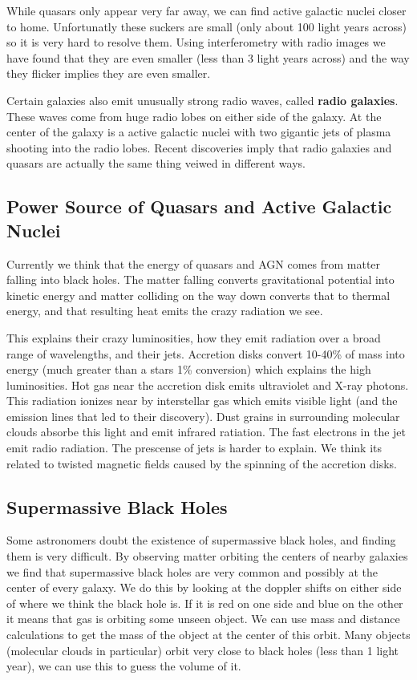 \documentclass[12pt]{article}
\begin{document}
While quasars only appear very far away, we can find active galactic nuclei closer to home. Unfortunatly these suckers are small (only about 100 light years across) so it is very hard to resolve them. Using interferometry with radio images we have found that they are even smaller (less than 3 light years across) and the way they flicker implies they are even smaller.

Certain galaxies also emit unusually strong radio waves, called \textbf{radio galaxies}. These waves come from huge radio lobes on either side of the galaxy. At the center of the galaxy is a active galactic nuclei with two gigantic jets of plasma shooting into the radio lobes. Recent discoveries imply that radio galaxies and quasars are actually the same thing veiwed in different ways.

\subsection{Power Source of Quasars and Active Galactic Nuclei}
Currently we think that the energy of quasars and AGN comes from matter falling into black holes. The matter falling converts gravitational potential into kinetic energy and matter colliding on the way down converts that to thermal energy, and that resulting heat emits the crazy radiation we see.

This explains their crazy luminosities, how they emit radiation over a broad range of wavelengths, and their jets. Accretion disks convert 10-40\% of mass into energy (much greater than a stars 1\% conversion) which explains the high luminosities. Hot gas near the accretion disk emits ultraviolet and X-ray photons. This radiation ionizes near by interstellar gas which emits visible light (and the emission lines that led to their discovery). Dust grains in surrounding molecular clouds absorbe this light and emit infrared ratiation. The fast electrons in the jet emit radio radiation. The prescense of jets is harder to explain. We think its related to twisted magnetic fields caused by the spinning of the accretion disks.

\subsection{Supermassive Black Holes}
Some astronomers doubt the existence of supermassive black holes, and finding them is very difficult. By observing matter orbiting the centers of nearby galaxies we find that supermassive black holes are very common and possibly at the center of every galaxy. We do this by looking at the doppler shifts on either side of where we think the black hole is. If it is red on one side and blue on the other it means that gas is orbiting some unseen object. We can use mass and distance calculations to get the mass of the object at the center of this orbit. Many objects (molecular clouds in particular) orbit very close to black holes (less than 1 light year), we can use this to guess the volume of it.
\end{document}
